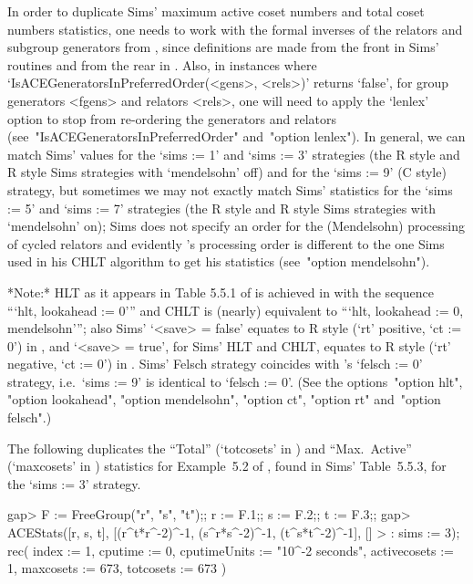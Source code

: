 In order to duplicate Sims' maximum active  coset  numbers  and  total
coset numbers statistics, one needs to work with the  formal  inverses
of the relators  and  subgroup  generators  from  \cite{Sim94},  since
definitions are made from the front in Sims'  routines  and  from  the
rear      in      {\ACE}.      Also,      in      instances      where
`IsACEGeneratorsInPreferredOrder(<gens>, <rels>)' returns `false', for
group generators <fgens> and relators <rels>, one will need  to  apply
the `lenlex' option to stop {\ACE} from re-ordering the generators and
relators (see~"IsACEGeneratorsInPreferredOrder" and~"option  lenlex").
In general, we can match Sims' values for the `sims := 1' and `sims :=
3' strategies  (the  R  style  and  R\*  style  Sims  strategies  with
`mendelsohn' off) and for the `sims :=  9'  (C  style)  strategy,  but
sometimes we may not exactly match Sims' statistics for the  `sims  :=
5' and `sims :=  7'  strategies  (the  R  style  and  R\*  style  Sims
strategies with `mendelsohn' on); Sims does not specify an  order  for
the (Mendelsohn) processing of cycled relators and evidently  {\ACE}'s
processing order is different  to  the  one  Sims  used  in  his  CHLT
algorithm to get his statistics (see~"option mendelsohn").

*Note:* 
HLT as it appears in Table 5.5.1 of \cite{Sim94} is achieved in {\ACE}
with the sequence ```hlt, lookahead  :=  0'''  and  CHLT  is  (nearly)
equivalent to  ```hlt,  lookahead  :=  0,  mendelsohn''';  also  Sims'
`<save> = false' equates to R style (`rt'  positive,  `ct  :=  0')  in
{\ACE}, and `<save> = true', for Sims' HLT and CHLT,  equates  to  R\*
style (`rt' negative, `ct := 0')  in  {\ACE}.  Sims'  Felsch  strategy
coincides with {\ACE}'s `felsch := 0' strategy, i.e.~`sims  :=  9'  is
identical to `felsch := 0'. (See  the  options~"option  hlt",  "option
lookahead", "option mendelsohn", "option ct", "option rt"  and~"option
felsch".)

The following duplicates the ``Total''  (`totcosets'  in  {\ACE})  and
``Max.~Active'' (`maxcosets' in {\ACE}) statistics for Example~5.2  of
\cite{Sim94},  found  in  Sims'  Table~5.5.3,  for  the  `sims  :=  3'
strategy.

\beginexample
gap> F := FreeGroup("r", "s", "t");; r := F.1;; s := F.2;; t := F.3;;
gap> ACEStats([r, s, t], [(r^t*r^-2)^-1, (s^r*s^-2)^-1, (t^s*t^-2)^-1], []
>             : sims := 3);
rec( index := 1, cputime := 0, cputimeUnits := "10^-2 seconds", 
  activecosets := 1, maxcosets := 673, totcosets := 673 )
\endexample

